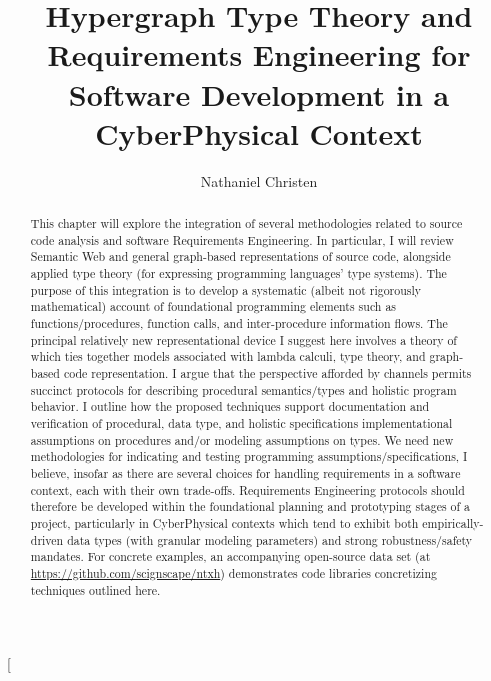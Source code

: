 \documentclass[11pt,twocolumn]{article}
\begin{document}
\title{Hypergraph Type Theory and Requirements Engineering 
for Software Development in a CyberPhysical Context}
\author{Nathaniel Christen}
\twocolumn[\begin{@twocolumnfalse}
\maketitle{}
\begin{abstract}This chapter will explore the integration of several methodologies 
related to source code analysis and software Requirements 
Engineering.  In particular, I will review Semantic Web 
and general graph-based representations of source code, 
alongside applied type theory (for expressing 
programming languages' type systems).  The purpose of this 
integration is to develop a systematic (albeit not 
rigorously mathematical) account of foundational programming 
elements such as functions/procedures, function calls, and 
inter-procedure information flows.  The principal relatively new 
representational device I suggest here involves a theory 
of  which ties together models associated with 
lambda calculi, type theory, and graph-based code representation.  
I argue that the perspective afforded by channels permits 
succinct protocols for describing procedural 
semantics/types and holistic program behavior.  I 
outline how the proposed techniques support documentation and 
verification of procedural, data type, and holistic 
specifications \mdash{} implementational assumptions on procedures  
and/or modeling assumptions on types.   
We need new methodologies for indicating and testing 
programming assumptions/specifications, I believe, insofar as 
there are several choices for handling requirements in 
a software context, each with their own trade-offs.  
Requirements Engineering protocols should therefore 
be developed within the foundational planning and 
prototyping stages of a project, particularly
in CyberPhysical contexts which tend to exhibit both 
empirically-driven data types (with granular 
modeling parameters) and strong robustness/safety mandates.
For concrete examples, an accompanying open-source data set (at
\url{https://github.com/scignscape/ntxh}) 
demonstrates code libraries concretizing 
techniques outlined here.
\end{abstract} 
\newsavebox{\qboxii}

\end{@twocolumnfalse}
\end{document}

